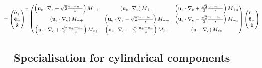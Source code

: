 \begin{equation}
\begin{aligned}
    &\mkern -40mu = \begin{pmatrix}\hat{\mathbf{e}}_+ \\ \hat{\mathbf{e}}_- \\ \hat{\mathbf{z}}\end{pmatrix}^\top 
    \begin{pmatrix}
        \left(\mathbf{u}_e\cdot \nabla_e + \sqrt{2} \frac{u_+ - u_-}{s}\right) M_{++} & \left(\mathbf{u}_e\cdot \nabla_e\right) M_{+-} & \left(\mathbf{u}_e\cdot \nabla_e + \frac{\sqrt{2}}{2} \frac{u_+ - u_-}{s}\right) M_{+z} \\[5pt] 
        \left(\mathbf{u}_e\cdot \nabla_e\right) M_{-+} & \left(\mathbf{u}_e\cdot \nabla_e - \sqrt{2} \frac{u_+ - u_-}{s}\right) M_{--} & \left(\mathbf{u}_e\cdot \nabla_e - \frac{\sqrt{2}}{2} \frac{u_+ - u_-}{s}\right) M_{-z} \\[5pt] 
        \left(\mathbf{u}_e\cdot \nabla_e + \frac{\sqrt{2}}{2} \frac{u_+ - u_-}{s}\right) M_{z+} & \left(\mathbf{u}_e\cdot \nabla_e - \frac{\sqrt{2}}{2} \frac{u_+ - u_-}{s}\right) M_{z-} & \left(\mathbf{u}_e\cdot \nabla_e\right) M_{zz}
    \end{pmatrix}
    \begin{pmatrix}\hat{\mathbf{e}}_+ \\ \hat{\mathbf{e}}_- \\ \hat{\mathbf{z}}\end{pmatrix}
\end{aligned}
\end{equation}


\subsection{Specialisation for cylindrical components}

